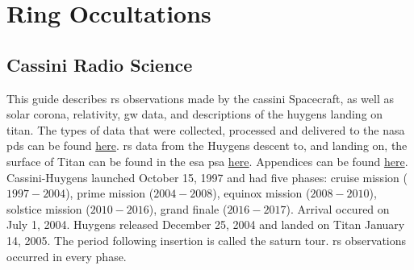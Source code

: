 \documentclass[crop=false,class=article,oneside]{standalone}
\begin{document}
    \ifx\ifresearchnotesosthemathematicsofcassini\undefined
        \section*{Ring Occultations}
        \setcounter{section}{1}
        \renewcommand\thesubfigure{%
            \arabic{section}.\arabic{figure}.\arabic{subfigure}%
        }
    \fi
    \subsection{Cassini Radio Science}
        \label{subsec:usr_cassini_radio_science}
        This guide describes \gls{rs} observations made
        by the \gls{cassini} Spacecraft, as well
        as \gls{solar corona}, \gls{relativity},
        \gls{gw} data, and descriptions of the
        \gls{huygens} landing on \gls{titan}. The types
        of data that were collected, processed and
        delivered to the \gls{nasa} \gls{pds} can be
        found \href{http://pds-atmospheres.nmsu.edu/}{here}.
        \gls{rs} data from the Huygens descent to,
        and landing on, the surface of Titan can be found
        in the \gls{esa} \gls{psa}
        \href{https://www.cosmos.esa.int/?%
              project=PSA&page=huygens}{here}.
        Appendices can be found
        \href{https://radioscience.jpl.nasa.gov/%
              publications/index.html}{here}.
        Cassini-Huygens launched October 15, 1997 and had
        five phases: \Gls{cruise mission} ($1997\!-\!2004$),
        \gls{prime mission} ($2004\! -\! 2008$),
        \gls{equinox mission} ($2008\! -\! 2010$),
        \gls{solstice mission} ($2010\! -\! 2016$),
        \gls{grand finale} ($2016\! - \!2017$).
        Arrival occured on July 1, 2004. Huygens
        released December 25, 2004 and landed on Titan
        January 14, 2005. The period following insertion
        is called the \gls{saturn tour}.
        \gls{rs} observations occurred in every phase.
\end{document}
